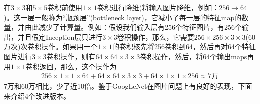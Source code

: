             \par
            在$3\times 3$和$5\times 5$卷积前使用$1\times 1$卷积进行降维(将输入图片降维，例如：$256\to 64$)。这一层一般称为“瓶颈层”(bottleneck layer)，\underline{它减小了每一层的特征map的数量}，并由此减少了计算量。例如：假设我们输入层有256个特征图片，有256个输出，并且假定Inception层只进行$3\times 3$卷积操作，那么，它需要$256\times 256\times 3\times 3$(60万次)次卷积操作。如果用一个$1\times 1$的卷积核先将256卷积到64，然后再对64个特征图片进行$3\times 3$卷积操作，则有$64\times 64\times 3\times 3$卷积操作，然后，将64个输出maps再用$1\times 1$卷积返回，那么，这个操作为
            \begin{align*}
            256\times 1\times 1\times 64 + 64\times 64 \times 3\times 3 + 64\times 1\times 1\times 256 \approx 7\text{万}
            \end{align*}
            7万和60万相比，少了近10倍。鉴于GoogLeNet在图片问题上有良好的表现，下面来介绍4个改进版本。

